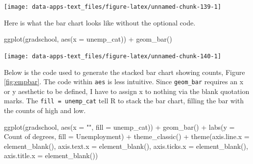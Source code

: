 \documentclass[
]{book}
\makeatletter
\newenvironment{Shaded}{\begin{snugshade}}{\end{snugshade}}
\newcommand{\AttributeTok}[1]{\textcolor[rgb]{0.61,0.61,0.61}{#1}}
\newcommand{\FunctionTok}[1]{\textcolor[rgb]{0,0,0}{#1}}
\newcommand{\NormalTok}[1]{#1}
\newcommand{\SpecialCharTok}[1]{\textcolor[rgb]{0,0,0}{#1}}
\newcommand{\StringTok}[1]{\textcolor[rgb]{0.5,0.5,0.5}{#1}}
\newenvironment{kframe}{%
\medskip{}
\setlength{\fboxsep}{.8em}
 \def\at@end@of@kframe{}%
 \ifinner\ifhmode%
  \def\at@end@of@kframe{\end{minipage}}%
  \begin{minipage}{\columnwidth}%
 \fi\fi%
 \def\FrameCommand##1{\hskip\@totalleftmargin \hskip-\fboxsep
 \colorbox{shadecolor}{##1}\hskip-\fboxsep
     \hskip-\linewidth \hskip-\@totalleftmargin \hskip\columnwidth}%
 \MakeFramed {\advance\hsize-\width
   \@totalleftmargin\z@ \linewidth\hsize
   \@setminipage}}%
 {\par\unskip\endMakeFramed%
 \at@end@of@kframe}
\renewenvironment{Shaded}{\begin{kframe}}{\end{kframe}}
\makeatother
\begin{document}
\begin{center}\texttt{[image: data-apps-text\_files/figure-latex/unnamed-chunk-139-1]} \end{center}

Here is what the bar chart looks like without the optional code.

\begin{Shaded}
\begin{Highlighting}[]
\FunctionTok{ggplot}\NormalTok{(gradschool, }\FunctionTok{aes}\NormalTok{(}\AttributeTok{x =}\NormalTok{ unemp\_cat)) }\SpecialCharTok{+}
  \FunctionTok{geom\_bar}\NormalTok{()}
\end{Highlighting}
\end{Shaded}

\begin{center}\texttt{[image: data-apps-text\_files/figure-latex/unnamed-chunk-140-1]} \end{center}

Below is the code used to generate the stacked bar chart showing counts, Figure \ref{fig:empbar}. The code within \texttt{aes} is less intuitive. Since \texttt{geom\_bar} requires an x or y aesthetic to be defined, I have to assign x to nothing via the blank quotation marks. The \texttt{fill\ =\ unemp\_cat} tell R to stack the bar chart, filling the bar with the counts of high and low.

\begin{Shaded}
\begin{Highlighting}[]
\FunctionTok{ggplot}\NormalTok{(gradschool, }\FunctionTok{aes}\NormalTok{(}\AttributeTok{x =} \StringTok{""}\NormalTok{, }\AttributeTok{fill =}\NormalTok{ unemp\_cat)) }\SpecialCharTok{+}
  \FunctionTok{geom\_bar}\NormalTok{() }\SpecialCharTok{+}
  \FunctionTok{labs}\NormalTok{(}\AttributeTok{y =} \StringTok{\textquotesingle{}Count of degrees\textquotesingle{}}\NormalTok{,}
       \AttributeTok{fill =} \StringTok{\textquotesingle{}Unemployment\textquotesingle{}}\NormalTok{) }\SpecialCharTok{+}
  \FunctionTok{theme\_classic}\NormalTok{() }\SpecialCharTok{+}
  \FunctionTok{theme}\NormalTok{(}\AttributeTok{axis.line.x =} \FunctionTok{element\_blank}\NormalTok{(),}
        \AttributeTok{axis.text.x =} \FunctionTok{element\_blank}\NormalTok{(),}
        \AttributeTok{axis.ticks.x =} \FunctionTok{element\_blank}\NormalTok{(),}
        \AttributeTok{axis.title.x =} \FunctionTok{element\_blank}\NormalTok{())}
\end{Highlighting}
\end{Shaded}
\end{document}
